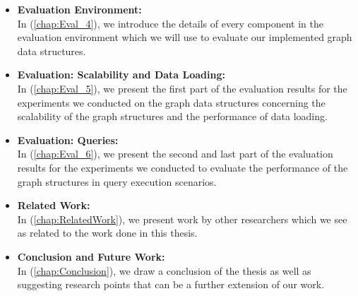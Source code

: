 {\begin{itemize}
\item \textbf{Evaluation Environment:}\\
In (\ref{chap:Eval_4}), we introduce the details of every component in the evaluation environment which we will use to evaluate our implemented graph data structures.

\item \textbf{Evaluation: Scalability and Data Loading:}\\
In (\ref{chap:Eval_5}), we present the first part of the evaluation results for the experiments we conducted on the graph data structures concerning the scalability of the graph structures and the performance of data loading.

\item \textbf{Evaluation: Queries:}\\
In (\ref{chap:Eval_6}), we present the second and last part of the evaluation results for the experiments we conducted to evaluate the performance of the graph structures in query execution scenarios.

\item \textbf{Related Work:}\\
In (\ref{chap:RelatedWork}), we present work by other researchers which we see as related to the work done in this thesis.

\item \textbf{Conclusion and Future Work:}\\
In (\ref{chap:Conclusion}), we draw a conclusion of the thesis as well as suggesting research points that can be a further extension of our work.  
\end{itemize}


}